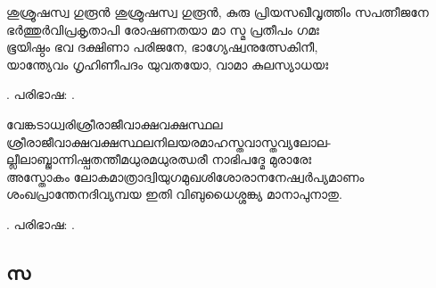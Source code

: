 \begin{enumerate}

\begin{slokam}{\VSv}{\KD}{ശുശ്രൂഷസ്വ ഗുരൂൻ}
ശുശ്രൂഷസ്വ ഗുരൂന്‍, കുരു പ്രിയസഖീവൃത്തിം സപത്നീജനേ\\
ഭര്‍ത്തുര്‍വിപ്രകൃതാപി രോഷണതയാ മാ സ്മ പ്രതീപം ഗമഃ\\
ഭൂയിഷ്ഠം ഭവ ദക്ഷിണാ പരിജനേ, ഭാഗ്യേഷ്വനുത്സേകിനീ,\\
യാന്ത്യേവം ഗൃഹിണീപദം യുവതയോ, വാമാ കുലസ്യാധയഃ
\end{slokam}


.  പരിഭാഷ: .

\begin{slokam}{\VSr}{വേങ്കടാധ്വരി}{ശ്രീരാജീവാക്ഷവക്ഷസ്ഥല}
ശ്രീരാജീവാക്ഷവക്ഷസ്ഥലനിലയരമാഹസ്തവാസ്തവ്യലോല-\\
ല്ലീലാബ്ജാന്നിഷ്പതന്തീമധുരമധുരഝരീ നാഭിപദ്മേ മുരാരേഃ\\
അസ്തോകം ലോകമാത്രാദ്വിയുഗമുഖശിശോരാനനേഷ്വര്‍പ്യമാണം\\
ശംഖപ്രാന്തേനദിവ്യമ്പയ ഇതി വിബുധൈശ്ശങ്ക്യ മാനാപുനാതു.
\end{slokam}


.  പരിഭാഷ: .

\end{enumerate}

\subsection{സ}

